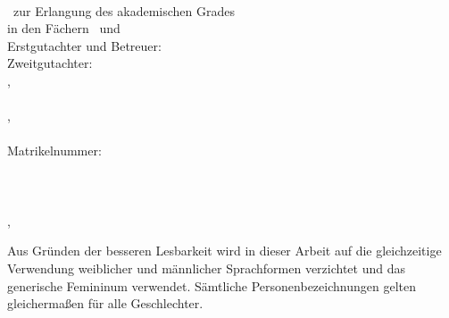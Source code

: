 \hfill
\vfill
{
	\small
	\textbf{\thesisTitle} \\
	\thesisSubject\ zur Erlangung des akademischen Grades \textit{\thesisDegree} \\
	in den Fächern \thesisAuthorFirstSubject\ und \thesisAuthorSecondSubject \\
	Erstgutachter und Betreuer: \thesisFirstReviewer \\
	Zweitgutachter: \thesisSecondReviewer \\
	\thesisAuthorCity, \thesisDate \\[1.5em]	
	\textbf{\thesisName} \\
	\thesisAuthorStreet, \thesisAuthorPostalCode\ \thesisAuthorCity \\
	\texttt{\thesisAuthorMail} \\
	Matrikelnummer: \thesisAuthorId \\[1.5em]
	\textbf{\thesisUniversity} \\
	\thesisUniversityDepartment \\
	\thesisUniversityInstitute \\
	\thesisUniversityStreetAddress, \thesisUniversityPostalCode\ \thesisUniversityCity
	
	\vspace*{0.5cm}
	
	\scriptsize
	Aus Gründen der besseren Lesbarkeit wird in dieser Arbeit auf die gleichzeitige Verwendung weiblicher und männlicher Sprachformen verzichtet und das generische Femininum verwendet.
	Sämtliche Personenbezeichnungen gelten gleichermaßen für alle Geschlechter.
}
